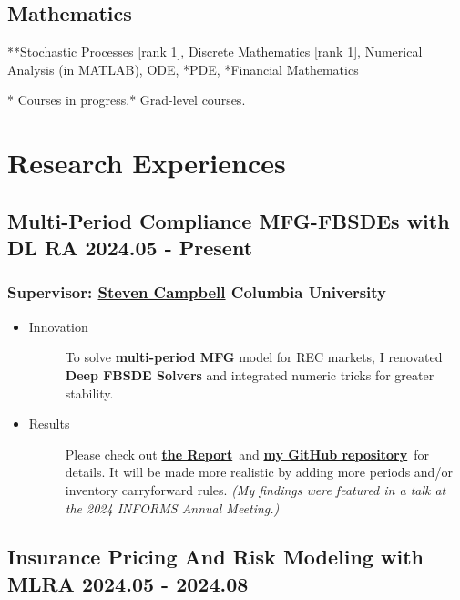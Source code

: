 \documentclass[a4paper]{article}
\newcommand{\mygray}{\color{lg}}
\newcommand{\MFG}{\href{https://github.com/OrangeAoo/Multi-Period-Compliance-MFG-FBSDEs}{\textbf{my GitHub repository}}}
\newcommand{\Report}{\href{https://github.com/OrangeAoo/Multi-Compliance-MFG-FBSDEs/blob/ca6adb57636c1fc1ff9daea8d57f004e5762fd4d/FinalReports/Report-v3.pdf}{\textbf{the Report}}}
\begin{document}
\subsection{Mathematics} 
**Stochastic Processes {\small[rank 1]}, Discrete Mathematics {\small[rank 1]}, Numerical Analysis {\small(in MATLAB)}, ODE, *PDE, *Financial Mathematics

{\parskip=2pt \mygray
* Courses in progress.\hfill ** Grad-level courses.}
\section{Research Experiences}  %

\hypertarget{FBSDEs}{
    \subsection{Multi-Period Compliance MFG-FBSDEs with DL \normalfont \hfill RA \hspace{40pt} 2024.05 - Present}}
    
\subsubsection{Supervisor:  \href{https://www.stevenacampbell.com/}{Steven Campbell} \hfill Columbia University}
\begin{itemize}
    \item\begin{description}
        \item[Innovation] To solve \textbf{multi-period MFG} model for REC markets, I renovated \textbf{Deep FBSDE Solvers} and integrated numeric tricks for greater stability.
        \end{description} 
    \item\begin{description}
        \item[Results] Please check out \Report\ and \MFG\ for details. It will be made more realistic by adding more periods and/or inventory carryforward rules. \textit{(My findings were featured in a talk at the 2024 INFORMS Annual Meeting.)}
    \end{description}
\end{itemize} 

\hypertarget{integrated-project}{
    \subsection{Insurance Pricing And Risk Modeling with ML\normalfont \hfill RA \hspace{40pt} 2024.05 - 2024.08}}
\end{document}
